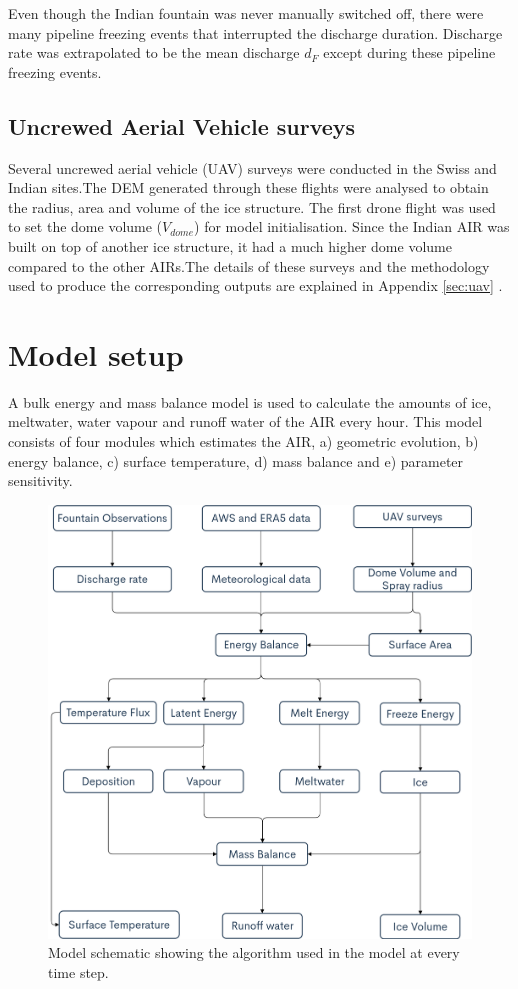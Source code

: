 \documentclass[utf8]{frontiersSCNS} %
\begin{document}
Even though the Indian fountain was never manually switched off, there were many pipeline freezing events that
interrupted the discharge duration. Discharge rate was extrapolated to be the mean discharge $d_F$ except during
these pipeline freezing events.

\subsection{Uncrewed Aerial Vehicle surveys}

Several uncrewed aerial vehicle (UAV) surveys were conducted in the Swiss and Indian sites.The DEM generated
through these flights were analysed to obtain the radius, area and volume of the ice structure.  The first drone
flight was used to set the dome volume ($V_{dome}$) for model initialisation. Since the Indian AIR was built on top
of another ice structure, it had a much higher dome volume compared to the other AIRs.The details of these surveys
and the methodology used to produce the corresponding outputs are explained in Appendix \ref{sec:uav} .

\section{Model setup}

A bulk energy and mass balance model is used to calculate the amounts of ice, meltwater, water vapour and runoff water
of the AIR every hour. This model consists of four modules which estimates the AIR, a) geometric evolution, b) energy
balance, c) surface temperature, d) mass balance and e) parameter sensitivity.

\begin{figure} \begin{center} \includegraphics[width=12 cm]{Figures/model_schematic.png} \end{center} \caption{Model
		schematic showing the algorithm used in the model at every time step. } \label{fig:schema} \end{figure}
\end{document}
